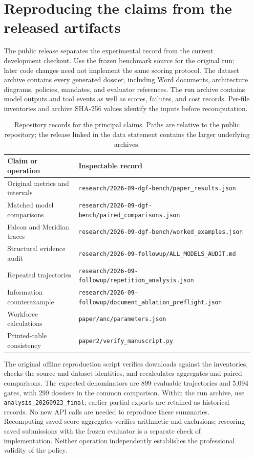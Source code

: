 \appendix
\section{Reproducing the claims from the released artifacts}
\label{sec:reproduction}

The public release separates the experimental record from the current development checkout.
Use the frozen benchmark source for the original run; later code changes need not implement
the same scoring protocol. The dataset archive contains every generated dossier, including
Word documents, architecture diagrams, policies, mandates, and evaluator references. The run
archive contains model outputs and tool events as well as scores, failures, and cost records.
Per-file inventories and archive SHA-256 values identify the inputs before recomputation.

\begin{table}[!htb]
\centering\small
\caption{Repository records for the principal claims. Paths are relative to the public
repository; the release linked in the data statement contains the larger underlying archives.}
\label{tab:reproduction-map}
\begin{tabularx}{\linewidth}{@{}P{3.1cm}L@{}}
\toprule
Claim or operation & Inspectable record\\
\midrule
Original metrics and intervals & \nolinkurl{research/2026-09-dgf-bench/paper_results.json}\\
Matched model comparisons & \nolinkurl{research/2026-09-dgf-bench/paired_comparisons.json}\\
Falcon and Meridian traces & \nolinkurl{research/2026-09-dgf-bench/worked_examples.json}\\
Structural evidence audit & \nolinkurl{research/2026-09-followup/ALL_MODELS_AUDIT.md}\\
Repeated trajectories & \nolinkurl{research/2026-09-followup/repetition_analysis.json}\\
Information counterexample & \nolinkurl{research/2026-09-followup/document_ablation_preflight.json}\\
Workforce calculations & \nolinkurl{paper/anc/parameters.json}\\
Printed-table consistency & \nolinkurl{paper2/verify_manuscript.py}\\
\bottomrule
\end{tabularx}
\end{table}

The original offline reproduction script verifies downloads against the inventories, checks
the source and dataset identities, and recalculates aggregates and paired comparisons. The
expected denominators are 899 evaluable trajectories and 5,094 gates, with 299 dossiers in
the common comparison. Within the run archive, use \texttt{analysis\_20260923\_final}; earlier
partial exports are retained as historical records. No new API calls are needed to reproduce
these summaries. Recomputing saved-score aggregates verifies arithmetic and exclusions;
rescoring saved submissions with the frozen evaluator is a separate check of implementation.
Neither operation independently establishes the professional validity of the policy.

